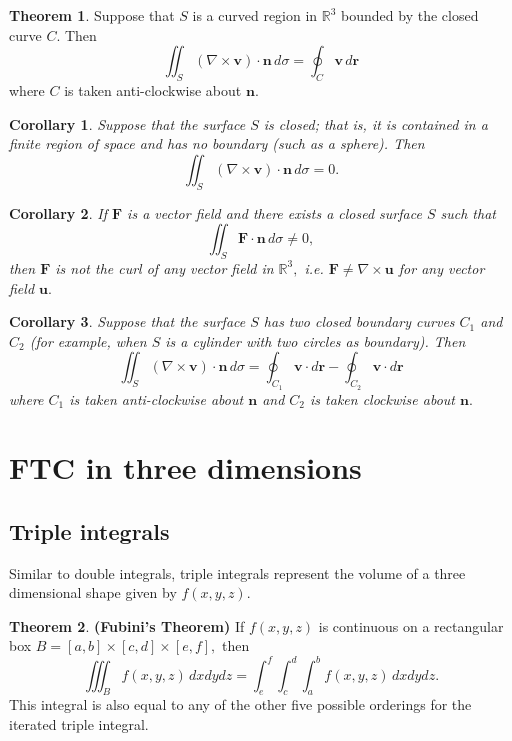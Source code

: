 \documentclass[12pt, a4paper]{article}
\newcommand{\bb}[1]{\mathbb{#1}}
\newcommand{\mb}[1]{\mathbf{#1}}
\theoremstyle{definition}
\newtheorem{theorem}{Theorem}[section]
\theoremstyle{plain}
\newtheorem{corollary}{Corollary}[theorem]
\begin{document}
\begin{theorem}
Suppose that $S$ is a curved region in $\bb{R}^3$ bounded by the closed curve $C.$ Then $$\iint_S (\nabla \times \mb{v})\cdot \mb{n} \, d\sigma =\oint_C \mb{v} \, d\mb{r}$$ where $C$ is taken anti-clockwise about $\mb{n}.$
\end{theorem}

\begin{corollary}
Suppose that the surface $S$ is closed; that is, it is contained in a finite region of space and has no boundary (such as a sphere). Then $$\iint_S (\nabla \times \mb{v})\cdot \mb{n} \, d\sigma = 0.$$
\end{corollary}

\begin{corollary}
If $\mb{F}$ is a vector field and there exists a closed surface $S$ such that $$\iint_S \mb{F}\cdot\mb{n} \, d\sigma \neq0,$$ then $\mb{F}$ is not the curl of any vector field in $\bb{R}^3,$ i.e. $\mb{F}\neq \nabla \times \mb{u}$ for any vector field $\mb{u}.$ 
\end{corollary}

\begin{corollary}
Suppose that the surface $S$ has two closed boundary curves $C_1$ and $C_2$ (for example, when $S$ is a cylinder with two circles as boundary). Then $$\iint_S (\nabla \times \mb{v})\cdot \mb{n} \, d\sigma= \oint_{C_1} \mb{v} \cdot d\mb{r} -\oint_{C_2} \mb{v} \cdot d\mb{r}$$ where $C_1$ is taken anti-clockwise about $\mb{n}$ and $C_2$ is taken clockwise about $\mb{n}.$
\end{corollary}

\section{FTC in three dimensions}

\subsection{Triple integrals}

Similar to double integrals, triple integrals represent the volume of a three dimensional shape given by $f(x,y,z).$

\begin{theorem} \textbf{(Fubini's Theorem)}
If $f(x, y, z)$ is continuous on a rectangular box $B = [a, b] \times [c, d] \times [e, f],$ then $$\iiint_B f(x,y,z) \, dxdydz =\int_e^f \int_c^d \int_a^b f(x,y,z) \, dxdydz.$$ This integral is also equal to any of the other five possible orderings for the iterated triple integral.
\end{theorem}
\end{document}
